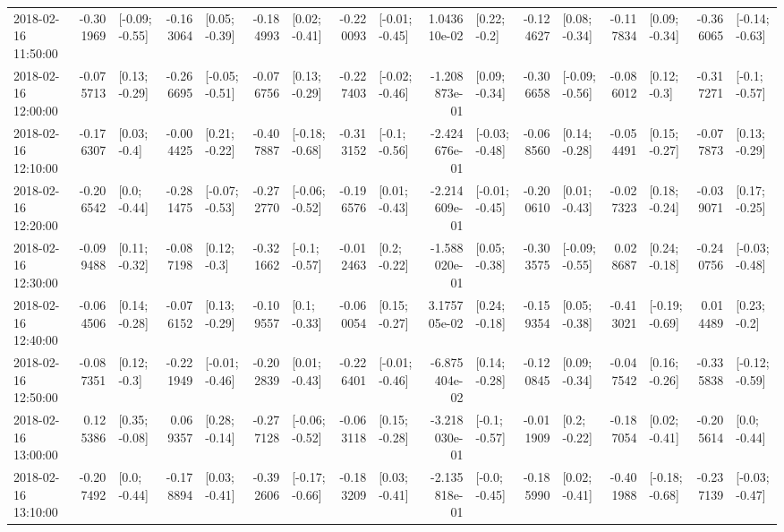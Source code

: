 \begin{tabular}{lrlrlrlrlrlrlrlrl}
2018-02-16 11:50:00 & -0.301969 &  [-0.09; -0.55] & -0.163064 &   [0.05; -0.39] & -0.184993 &   [0.02; -0.41] & -0.220093 &  [-0.01; -0.45] &  1.043610e-02 &    [0.22; -0.2] & -0.124627 &   [0.08; -0.34] & -0.117834 &   [0.09; -0.34] & -0.366065 &  [-0.14; -0.63] \\
2018-02-16 12:00:00 & -0.075713 &   [0.13; -0.29] & -0.266695 &  [-0.05; -0.51] & -0.076756 &   [0.13; -0.29] & -0.227403 &  [-0.02; -0.46] & -1.208873e-01 &   [0.09; -0.34] & -0.306658 &  [-0.09; -0.56] & -0.086012 &    [0.12; -0.3] & -0.317271 &   [-0.1; -0.57] \\
2018-02-16 12:10:00 & -0.176307 &    [0.03; -0.4] & -0.004425 &   [0.21; -0.22] & -0.407887 &  [-0.18; -0.68] & -0.313152 &   [-0.1; -0.56] & -2.424676e-01 &  [-0.03; -0.48] & -0.068560 &   [0.14; -0.28] & -0.054491 &   [0.15; -0.27] & -0.077873 &   [0.13; -0.29] \\
2018-02-16 12:20:00 & -0.206542 &    [0.0; -0.44] & -0.281475 &  [-0.07; -0.53] & -0.272770 &  [-0.06; -0.52] & -0.196576 &   [0.01; -0.43] & -2.214609e-01 &  [-0.01; -0.45] & -0.200610 &   [0.01; -0.43] & -0.027323 &   [0.18; -0.24] & -0.039071 &   [0.17; -0.25] \\
2018-02-16 12:30:00 & -0.099488 &   [0.11; -0.32] & -0.087198 &    [0.12; -0.3] & -0.321662 &   [-0.1; -0.57] & -0.012463 &    [0.2; -0.22] & -1.588020e-01 &   [0.05; -0.38] & -0.303575 &  [-0.09; -0.55] &  0.028687 &   [0.24; -0.18] & -0.240756 &  [-0.03; -0.48] \\
2018-02-16 12:40:00 & -0.064506 &   [0.14; -0.28] & -0.076152 &   [0.13; -0.29] & -0.109557 &    [0.1; -0.33] & -0.060054 &   [0.15; -0.27] &  3.175705e-02 &   [0.24; -0.18] & -0.159354 &   [0.05; -0.38] & -0.413021 &  [-0.19; -0.69] &  0.014489 &    [0.23; -0.2] \\
2018-02-16 12:50:00 & -0.087351 &    [0.12; -0.3] & -0.221949 &  [-0.01; -0.46] & -0.202839 &   [0.01; -0.43] & -0.226401 &  [-0.01; -0.46] & -6.875404e-02 &   [0.14; -0.28] & -0.120845 &   [0.09; -0.34] & -0.047542 &   [0.16; -0.26] & -0.335838 &  [-0.12; -0.59] \\
2018-02-16 13:00:00 &  0.125386 &   [0.35; -0.08] &  0.069357 &   [0.28; -0.14] & -0.277128 &  [-0.06; -0.52] & -0.063118 &   [0.15; -0.28] & -3.218030e-01 &   [-0.1; -0.57] & -0.011909 &    [0.2; -0.22] & -0.187054 &   [0.02; -0.41] & -0.205614 &    [0.0; -0.44] \\
2018-02-16 13:10:00 & -0.207492 &    [0.0; -0.44] & -0.178894 &   [0.03; -0.41] & -0.392606 &  [-0.17; -0.66] & -0.183209 &   [0.03; -0.41] & -2.135818e-01 &   [-0.0; -0.45] & -0.185990 &   [0.02; -0.41] & -0.401988 &  [-0.18; -0.68] & -0.237139 &  [-0.03; -0.47] \\

\end{tabular}
